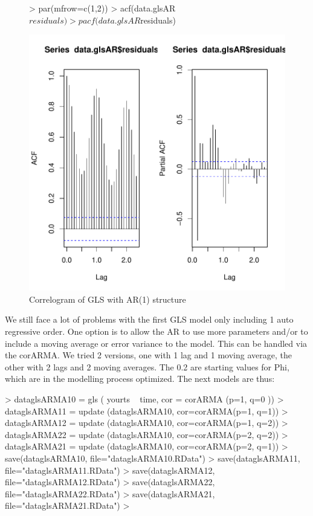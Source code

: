 \documentclass[11pt, a4paper]{article} %
\begin{document}
\begin{figure}[H]
\centering
\begin{Schunk}
\begin{Sinput}
> par(mfrow=c(1,2))
> acf(data.glsAR$residuals)
> pacf(data.glsAR$residuals)
\end{Sinput}
\end{Schunk}
\includegraphics{alleselena-correlogram}
\caption{Correlogram of GLS  with AR(1) structure}
\label{corglsAR}
\end{figure}

We still face a lot of problems with the first GLS model only including 1 auto regressive order. 
One option is to allow the AR to use more parameters and/or to include a moving average or error variance to the model. This can be handled via the corARMA. We tried 2 versions, one with 1 lag and 1 moving average, the other with 2 lags and 2 moving averages.
The 0.2 are starting values for Phi, which are in the modelling process optimized.
The next models are thus:
\begin{Schunk}
\begin{Sinput}
> dataglsARMA10 = gls ( yourts ~ time, cor = corARMA (p=1, q=0 ))
> dataglsARMA11 = update (dataglsARMA10, cor=corARMA(p=1, q=1))
> dataglsARMA12 = update (dataglsARMA10, cor=corARMA(p=1, q=2))
> dataglsARMA22 = update (dataglsARMA10, cor=corARMA(p=2, q=2))
> dataglsARMA21 = update (dataglsARMA10, cor=corARMA(p=2, q=1))
> save(dataglsARMA10, file="dataglsARMA10.RData")
> save(dataglsARMA11, file="dataglsARMA11.RData")
> save(dataglsARMA12, file="dataglsARMA12.RData")
> save(dataglsARMA22, file="dataglsARMA22.RData")
> save(dataglsARMA21, file="dataglsARMA21.RData")
> 
\end{Sinput}
\end{Schunk}
\end{document}

